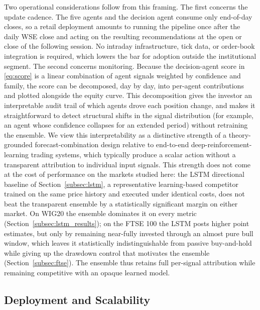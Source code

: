\documentclass{ieeeaccess}
\begin{document}
Two operational considerations follow from this framing. The first concerns the update cadence. The five agents and the decision agent consume only end-of-day closes, so a retail deployment amounts to running the pipeline once after the daily WSE close and acting on the resulting recommendations at the open or close of the following session. No intraday infrastructure, tick data, or order-book integration is required, which lowers the bar for adoption outside the institutional segment. The second concerns monitoring. Because the decision-agent score in \eqref{eq:score} is a linear combination of agent signals weighted by confidence and family, the score can be decomposed, day by day, into per-agent contributions and plotted alongside the equity curve. This decomposition gives the investor an interpretable audit trail of which agents drove each position change, and makes it straightforward to detect structural shifts in the signal distribution (for example, an agent whose confidence collapses for an extended period) without retraining the ensemble. We view this interpretability as a distinctive strength of a theory-grounded forecast-combination design relative to end-to-end deep-reinforcement-learning trading systems, which typically produce a scalar action without a transparent attribution to individual input signals. This strength does not come at the cost of performance on the markets studied here: the LSTM directional baseline of Section~\ref{subsec:lstm}, a representative learning-based competitor trained on the same price history and executed under identical costs, does not beat the transparent ensemble by a statistically significant margin on either market. On WIG20 the ensemble dominates it on every metric (Section~\ref{subsec:lstm_results}); on the FTSE 100 the LSTM posts higher point estimates, but only by remaining near-fully invested through an almost pure bull window, which leaves it statistically indistinguishable from passive buy-and-hold while giving up the drawdown control that motivates the ensemble (Section~\ref{subsec:ftse}). The ensemble thus retains full per-signal attribution while remaining competitive with an opaque learned model.

\subsection{Deployment and Scalability}
\label{subsec:deployment}
\end{document}
